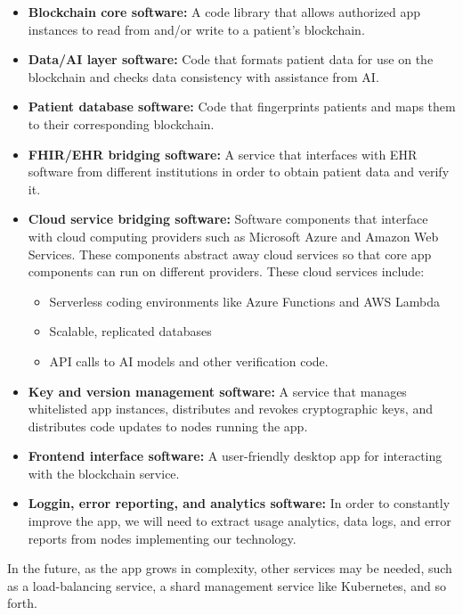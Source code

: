 \documentclass[12pt]{article}
\begin{document}
\begin{itemize}
\item {\bf Blockchain core software:} A code library that allows authorized app instances to read from and/or write to a patient's blockchain.

\item {\bf Data/AI layer software:} Code that formats patient data for use on the blockchain and checks data consistency with assistance from AI.

\item {\bf Patient database software:} Code that fingerprints patients and maps them to their corresponding blockchain.

\item {\bf FHIR/EHR bridging software:} A service that interfaces with EHR software from different institutions in order to obtain patient data and verify it.

\item {\bf Cloud service bridging software:} Software components that interface with cloud computing providers such as Microsoft Azure and Amazon Web Services. These components abstract away cloud services so that core app components can run on different providers. These cloud services include:
	\begin{itemize}
	\item Serverless coding environments like Azure Functions and AWS Lambda

	\item Scalable, replicated databases

	\item API calls to AI models and other verification code.
	\end{itemize}
\item {\bf Key and version management software:} A service that manages whitelisted app instances, distributes and revokes cryptographic keys, and distributes code updates to nodes running the app.
\item {\bf Frontend interface software:} A user-friendly desktop app for interacting with the blockchain service.
\item {\bf Loggin, error reporting, and analytics software:} In order to constantly improve the app, we will need to extract usage analytics, data logs, and error reports from nodes implementing our technology.
\end{itemize}

In the future, as the app grows in complexity, other services may be needed, such as a load-balancing service, a shard management service like Kubernetes, and so forth.
\end{document}
